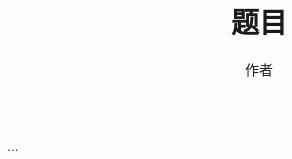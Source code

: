\documentclass[a4paper,10pt,oneside]{book}
\title{题目}
\author{作者}
\begin{document}
\maketitle
\tableofcontents
...
\end{document}
